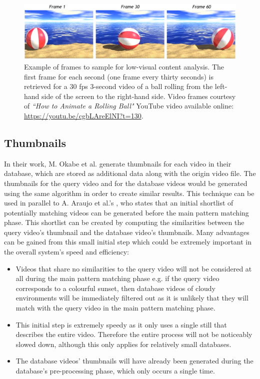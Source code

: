 \begin{figure}[h]
\centerline{\includegraphics[width=\textwidth]{figures/ball_rolling.jpg}}
\caption{\label{fig:rolling_ball}Example of frames to sample for low-visual content analysis. The first frame for each second (one frame every thirty seconds) is retrieved for a 30 fps 3-second video of a ball rolling from the left-hand side of the screen to the right-hand side. Video frames courtesy of \textit{``How to Animate a Rolling Ball"} YouTube video available online: \url{https://youtu.be/cgbLAreElNI?t=130}.}
\end{figure}


\subsection{Thumbnails}

In their work, M. Okabe et al. \cite{okabe2018animating} generate thumbnails for each video in their database, which are stored as additional data along with the origin video file. The thumbnails for the query video and for the database videos would be generated using the same algorithm in order to create similar results. This technique can be used in parallel to A. Araujo et al.'s \cite{araujo2017i2v}, who states that an initial shortlist of potentially matching videos can be generated before the main pattern matching phase. This shortlist can be created by computing the similarities between the query video's thumbnail and the database video's thumbnails. Many advantages can be gained from this small initial step which could be extremely important in the overall system's speed and efficiency:
\begin{itemize}
    \item Videos that share no similarities to the query video will not be considered at all during the main pattern matching phase e.g. if the query video corresponds to a colourful sunset, then database videos of cloudy environments will be immediately filtered out as it is unlikely that they will match with the query video in the main pattern matching phase.
    \item This initial step is extremely speedy as it only uses a single still that describes the entire video. Therefore the entire process will not be noticeably slowed down, although this only applies for relatively small databases.
    \item The database videos' thumbnails will have already been generated during the database's pre-processing phase, which only occurs a single time.
\end{itemize}

